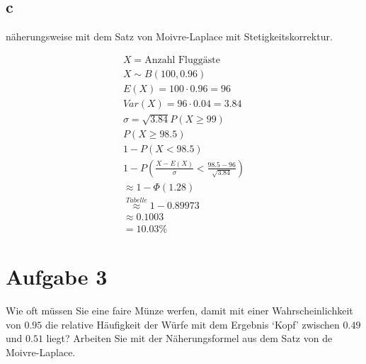 \subsection{c}

näherungsweise mit dem Satz von Moivre-Laplace mit Stetigkeitskorrektur.

\begin{align*}
    X = \text{Anzahl Fluggäste}                                               \\
    X \sim B(100, 0.96)                                                       \\
    E(X) = 100 \cdot 0.96 = 96                                                \\
    Var(X) = 96 \cdot 0.04 = 3.84                                             \\
    \sigma = \sqrt{3.84}
    P(X \geq 99)                                                              \\
    P(X \geq 98.5)                                                            \\
    1 - P(X < 98.5)                                                           \\
    1 - P\left(\frac{X - E(X)}{\sigma} < \frac{98.5 - 96}{\sqrt{3.84}}\right) \\
    \approx 1 - \Phi(1.28)                                                    \\
    \overset{Tabelle}{\approx} 1 - 0.89973                                    \\
    \approx 0.1003                                                            \\
    = 10.03 \%
\end{align*}

\section{Aufgabe 3}

Wie oft müssen Sie eine faire Münze werfen, damit mit einer Wahrscheinlichkeit
von $0.95$ die relative Häufigkeit der Würfe mit dem Ergebnis `Kopf' zwischen
$0.49$ und $0.51$ liegt? Arbeiten Sie mit der Näherungsformel aus dem Satz von
de Moivre-Laplace.

